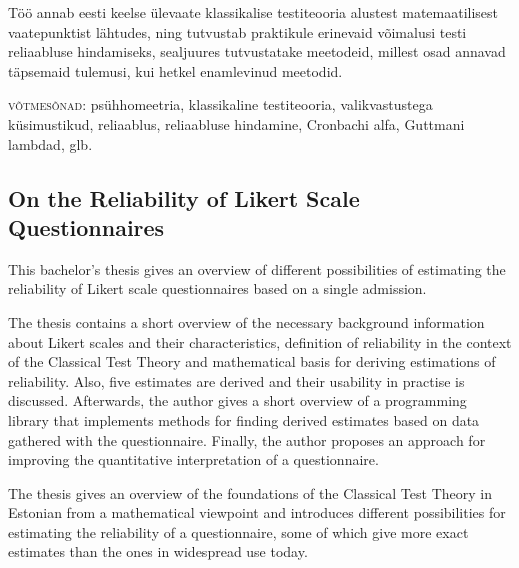 \documentclass[a4paper,12pt,oneside]{article}
\newcommand{\nocontentsline}[3]{}
\newcommand{\tocless}[2]{\bgroup\let\addcontentsline=\nocontentsline#1{#2}\egroup}
\numberwithin{equation}{section}
\theoremstyle{definition}
\begin{document}
Töö annab eesti keelse ülevaate klassikalise testiteooria alustest matemaatilisest vaatepunktist lähtudes, ning tutvustab praktikule erinevaid võimalusi testi reliaabluse hindamiseks, sealjuures tutvustatake meetodeid, millest osad annavad täpsemaid tulemusi, kui hetkel enamlevinud meetodid. 


\textsc{võtmesõnad:} psühhomeetria, klassikaline testiteooria,  valikvastustega kü\-si\-mus\-tikud, reliaablus, reliaabluse hindamine,  Cronbachi alfa, Guttmani lambdad, glb. 

\pagebreak

\makeatletter
\tocless{\subsection*{On the Reliability of Likert Scale Questionnaires}}

\tocless{\subsubsection*{\@author}}

\tocless{\subsubsection*{Abstract}}



\makeatother

This bachelor's thesis gives an overview of different possibilities of estimating the reliability of Likert scale questionnaires based on a single admission.

The thesis contains a short overview of the necessary background information about Likert scales and their characteristics, definition of reliability in the context of the Classical Test Theory and mathematical basis for deriving estimations of reliability. Also, five estimates are derived and their usability in practise is discussed. Afterwards, the author gives a short overview of a programming library that implements methods for finding derived estimates based on data gathered with the questionnaire. Finally, the author proposes an approach for improving the quantitative interpretation of a questionnaire.

The thesis gives an overview of the foundations of the Classical Test Theory in Estonian from a mathematical viewpoint and introduces different possibilities for estimating the reliability of a questionnaire, some of which give more exact estimates than the ones in widespread use today.
\end{document}
